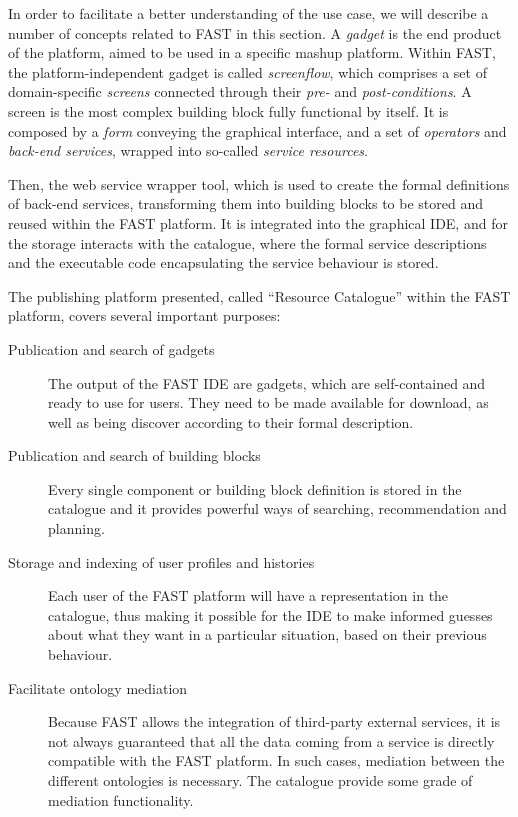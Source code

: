 In order to facilitate a better understanding of the use case, we will describe a number of concepts related to FAST in this section. A \emph{gadget} is the end product of the platform, aimed to be used in a specific mashup platform. Within FAST, the platform-independent gadget is called \emph{screenflow}, which comprises a set of domain-specific \emph{screens} connected through their \emph{pre-} and \emph{post-conditions}. A screen is the most complex building block fully functional by itself. It is composed by a \emph{form} conveying the graphical interface, and a set of \emph{operators} and \emph{back-end services}, wrapped into so-called \emph{service resources}.

Then, the web service wrapper tool, which is used to create the formal definitions of back-end services, transforming them into building blocks to be stored and reused within the FAST platform. It is integrated into the graphical IDE, and for the storage interacts with the catalogue, where the formal service descriptions and the executable code encapsulating the service behaviour is stored.

The publishing platform presented, called ``Resource Catalogue'' within the FAST platform, covers several important purposes:
\begin{description}
	\item[Publication and search of gadgets] The output of the FAST IDE are gadgets, which are self-contained and ready to use for users. They need to be made available for download, as well as being discover according to their formal description.
	\item[Publication and search of building blocks] Every single component or building block definition is stored in the catalogue and it provides powerful ways of searching, recommendation and planning. 
	\item[Storage and indexing of user profiles and histories] Each user of the FAST platform will have a representation in the catalogue, thus making it possible for the IDE to make informed guesses about what they want in a particular situation, based on their previous behaviour.
	\item[Facilitate ontology mediation] Because FAST allows the integration of third-party external services, it is not always guaranteed that all the data coming from a service is directly compatible with the FAST platform. In such cases, mediation between the different ontologies is necessary. The catalogue provide some grade of mediation functionality.
\end{description}
